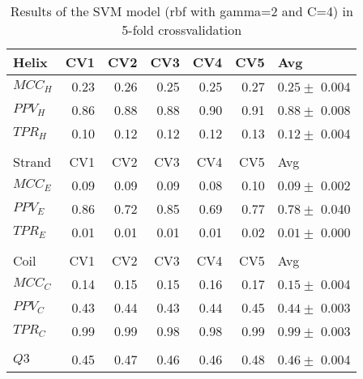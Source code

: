 \documentclass[11pt]{article}
\begin{document}
\begin{table}[htbp]
\caption{Results of the SVM model (rbf with gamma=2 and C=4) in 5-fold crossvalidation}
\centering
\begin{tabular}{lrrrrrl}
Helix & CV1 & CV2 & CV3 & CV4 & CV5 & Avg\\
\hline
\(MCC_H\) & 0.23 & 0.26 & 0.25 & 0.25 & 0.27 & \(0.25 \pm\) 0.004\\
\(PPV_H\) & 0.86 & 0.88 & 0.88 & 0.90 & 0.91 & \(0.88 \pm\) 0.008\\
\(TPR_H\) & 0.10 & 0.12 & 0.12 & 0.12 & 0.13 & \(0.12 \pm\) 0.004\\
 &  &  &  &  &  & \\
Strand & CV1 & CV2 & CV3 & CV4 & CV5 & Avg\\
\hline
\(MCC_E\) & 0.09 & 0.09 & 0.09 & 0.08 & 0.10 & \(0.09 \pm\) 0.002\\
\(PPV_E\) & 0.86 & 0.72 & 0.85 & 0.69 & 0.77 & \(0.78 \pm\) 0.040\\
\(TPR_E\) & 0.01 & 0.01 & 0.01 & 0.01 & 0.02 & \(0.01 \pm\) 0.000\\
 &  &  &  &  &  & \\
Coil & CV1 & CV2 & CV3 & CV4 & CV5 & Avg\\
\hline
\(MCC_C\) & 0.14 & 0.15 & 0.15 & 0.16 & 0.17 & \(0.15\pm\) 0.004\\
\(PPV_C\) & 0.43 & 0.44 & 0.43 & 0.44 & 0.45 & \(0.44 \pm\) 0.003\\
\(TPR_C\) & 0.99 & 0.99 & 0.98 & 0.98 & 0.99 & \(0.99 \pm\) 0.003\\
 &  &  &  &  &  & \\
\hline
\(Q3\) & 0.45 & 0.47 & 0.46 & 0.46 & 0.48 & \(0.46 \pm\) 0.004\\
\end{tabular}
\end{table}
\end{document}
